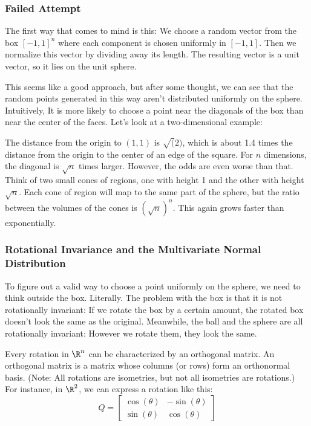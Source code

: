 \documentclass{article}
\begin{document}
\subsubsection{Failed Attempt}

The first way that comes to mind is this: We choose a random vector from the box $[-1, 1]^n$ where each component is chosen uniformly in $[-1, 1]$. Then we normalize this vector by dividing away its length. The resulting vector is a unit vector, so it lies on the unit sphere.

This seems like a good approach, but after some thought, we can see that the random points generated in this way aren't distributed uniformly on the sphere. Intuitively, It is more likely to choose a point near the diagonals of the box than near the center of the faces. Let's look at a two-dimensional example:


The distance from the origin to $(1, 1)$ is $\sqrt(2)$, which is about 1.4 times the distance from the origin to the center of an edge of the square. For $n$ dimensions, the diagonal is $\sqrt{n}$ times larger. However, the odds are even worse than that. Think of two small cones of regions, one with height 1 and the other with height $\sqrt{n}$. Each cone of region will map to the same part of the sphere, but the ratio between the volumes of the cones is $(\sqrt{n})^n$. This again grows faster than exponentially.

\subsubsection{Rotational Invariance and the Multivariate Normal Distribution}

To figure out a valid way to choose a point uniformly on the sphere, we need to think outside the box. Literally. The problem with the box is that it is not rotationally invariant: If we rotate the box by a certain amount, the rotated box doesn't look the same as the original. Meanwhile, the ball and the sphere are all rotationally invariant: However we rotate them, they look the same.

Every rotation in $\R^n$ can be characterized by an orthogonal matrix. An orthogonal matrix is a matrix whose columns (or rows) form an orthonormal basis. (Note: All rotations are isometries, but not all isometries are rotations.) For instance, in $\R^2$, we can express a rotation like this:
\[
  Q = \begin{bmatrix}
    \cos(\theta) & -\sin(\theta) \\
    \sin(\theta) & \cos(\theta)
  \end{bmatrix}
\]
\end{document}
